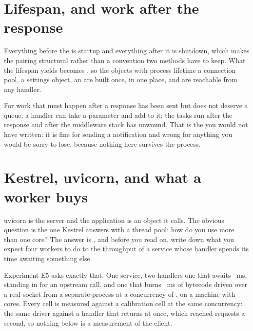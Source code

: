 \section{Lifespan, and work after the response}
\label{sec:ch09-lifespan}


\noindent
Everything before the  is startup and everything after it is
shutdown, which makes the pairing structural rather than a convention two
methods have to keep. What the lifespan yields becomes ,
so the objects with process lifetime \dash{} a connection pool, a settings
object, an  \dash{} are built once, in one place,
and are reachable from any handler.

For work that must happen after a response has been sent but does not deserve
a queue, a handler can take a  parameter and add to it;
the tasks run after the response and after the middleware stack has unwound.
That is the  you would not have written: it is fine for
sending a notification and wrong for anything you would be sorry to lose,
because nothing here survives the process.

\section{Kestrel, uvicorn, and what a worker buys}
\label{sec:ch09-workers}

uvicorn is the server and the application is an object it calls. The obvious
question is the one Kestrel answers with a thread pool: how do you use more
than one core? The answer is , and before you read on, write
down what you expect four workers to do to the throughput of a service whose
handler spends its time awaiting something else.

Experiment E5 asks exactly that. One service, two handlers \dash{} one that
awaits ~ms, standing in for an upstream call, and one that
burns ~ms of bytecode \dash{} driven over a real socket from
a separate process at a concurrency of , on a machine with
 cores. Every cell is measured against a calibration cell at
the same concurrency: the same driver against a handler that returns at once,
which reached  requests a second, so nothing below is a
measurement of the client.

